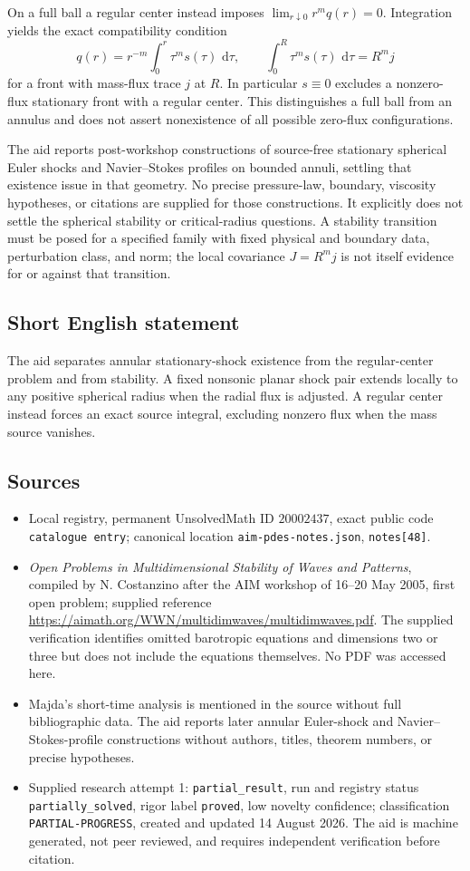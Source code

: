 \documentclass[11pt]{article}
\newcommand{\dd}{\,\mathrm{d}}
\begin{document}
On a full ball a regular center instead imposes \(\lim_{r\downarrow0}r^m q(r)=0\). Integration yields the exact compatibility condition
\[
 q(r)=r^{-m}\int_0^r\tau^m s(\tau)\,\dd\tau,
 \qquad
 \int_0^R\tau^m s(\tau)\,\dd\tau=R^mj
\]
for a front with mass-flux trace \(j\) at \(R\). In particular \(s\equiv0\) excludes a nonzero-flux stationary front with a regular center. This distinguishes a full ball from an annulus and does not assert nonexistence of all possible zero-flux configurations.

The aid reports post-workshop constructions of source-free stationary spherical Euler shocks and Navier--Stokes profiles on bounded annuli, settling that existence issue in that geometry. No precise pressure-law, boundary, viscosity hypotheses, or citations are supplied for those constructions. It explicitly does not settle the spherical stability or critical-radius questions. A stability transition must be posed for a specified family with fixed physical and boundary data, perturbation class, and norm; the local covariance \(J=R^mj\) is not itself evidence for or against that transition.
\subsection{Short English statement}
The aid separates annular stationary-shock existence from the regular-center problem and from stability. A fixed nonsonic planar shock pair extends locally to any positive spherical radius when the radial flux is adjusted. A regular center instead forces an exact source integral, excluding nonzero flux when the mass source vanishes.
\subsection{Sources}
\begin{itemize}
\item Local registry, permanent UnsolvedMath ID \(20002437\), exact public code \texttt{catalogue entry}; canonical location \texttt{aim-pdes-notes.json}, \texttt{notes[48]}.
\item \emph{Open Problems in Multidimensional Stability of Waves and Patterns}, compiled by N. Costanzino after the AIM workshop of 16--20 May 2005, first open problem; supplied reference \url{https://aimath.org/WWN/multidimwaves/multidimwaves.pdf}. The supplied verification identifies omitted barotropic equations and dimensions two or three but does not include the equations themselves. No PDF was accessed here.
\item Majda's short-time analysis is mentioned in the source without full bibliographic data. The aid reports later annular Euler-shock and Navier--Stokes-profile constructions without authors, titles, theorem numbers, or precise hypotheses.
\item Supplied research attempt 1: \texttt{partial\_result}, run and registry status \texttt{partially\_solved}, rigor label \texttt{proved}, low novelty confidence; classification \texttt{PARTIAL-PROGRESS}, created and updated 14 August 2026. The aid is machine generated, not peer reviewed, and requires independent verification before citation.
\end{itemize}
\end{document}
